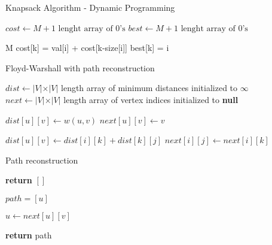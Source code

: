 \documentclass{article}
\begin{document}
\begin{algorithm}[h]
\caption{Knapsack Algorithm - Dynamic Programming}
\begin{algorithmic}[1]


\State $cost \gets M + 1 \text{ lenght array of 0's}$
\State $best \gets M + 1 \text{ lenght array of 0's}$

 {M}
			\State cost[k] = val[i] + cost[k-size[i]]
			\State best[k] = i
		\EndIf
	\EndFor
\EndFor
\EndProcedure

\end{algorithmic}
\end{algorithm}

\begin{algorithm}[h]
\caption{Floyd-Warshall with path reconstruction}
\begin{algorithmic}[1]

\State $dist \gets  \vert V \vert \times \vert V \vert$ length array of minimum distances initialized to $\infty$
\State $next \gets \vert V \vert \times \vert V \vert$ length array of vertex indices initialized to \textbf{null}


	\State $dist[u][v] \gets w(u, v)$
	\State $next[u][v] \gets v$
\EndFor

				\State $dist[u][v] \gets dist[i][k] + dist[k][j]$
				\State $next[i][j] \gets next[i][k]$
			\EndIf
		\EndFor
	\EndFor
\EndFor

\EndProcedure

\end{algorithmic}
\end{algorithm}

\begin{algorithm}[h]
\caption{Path reconstruction}
\begin{algorithmic}[1]


	\State \textbf{return} $[]$
\EndIf

\State $path = [u]$

	\State $u \gets next[u][v]$
	\State {}
\EndWhile

\State \textbf{return} path

\EndProcedure

\end{algorithmic}
\end{algorithm}
\end{document}
